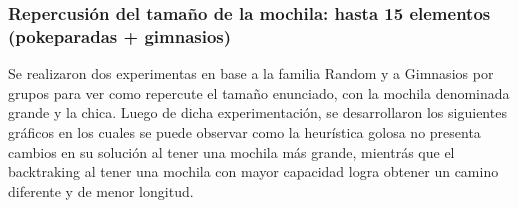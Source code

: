 \newpage   

\subsubsection*{Repercusi\'on del tamaño de la mochila: hasta 15 elementos (pokeparadas + gimnasios)}

Se realizaron dos experimentas en base a la familia Random y a Gimnasios por grupos para ver como repercute el tamaño enunciado, con la mochila denominada grande y la chica. Luego de dicha experimentación, se desarrollaron los siguientes gr\'aficos en los cuales se puede observar como la heur\'istica golosa no presenta cambios en su soluci\'on al tener una mochila más grande, mientr\'as que el backtraking al tener una mochila con mayor capacidad logra obtener un camino diferente y de menor longitud.\\

